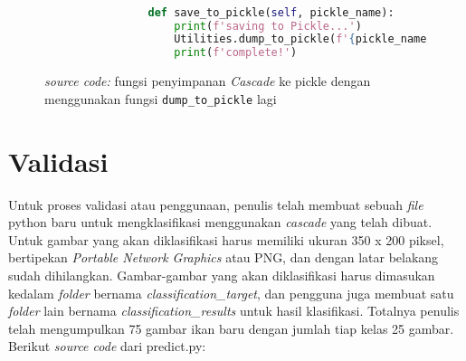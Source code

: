		\begin{figure}[H]
			\begin{lstlisting}[language=Python, basicstyle=\tiny]

				def save_to_pickle(self, pickle_name):
					print(f'saving to Pickle...')
					Utilities.dump_to_pickle(f'{pickle_name}', self)
					print(f'complete!')

			\end{lstlisting}
			\caption{\emph{source code: } fungsi penyimpanan \emph{Cascade} ke pickle 
			dengan menggunakan fungsi \texttt{dump\_to\_pickle} lagi}
			\label{code: save Cascade to pickle}
		\end{figure}

\section{Validasi}

		Untuk proses validasi atau penggunaan, penulis telah membuat sebuah \textit{file} 
		python baru untuk mengklasifikasi menggunakan \emph{cascade} yang telah dibuat. Untuk gambar 
		yang akan diklasifikasi harus memiliki ukuran 350 x 200 piksel, bertipekan \textit{Portable Network Graphics} 
		atau PNG, dan dengan latar belakang sudah dihilangkan. Gambar-gambar yang akan diklasifikasi harus 
		dimasukan kedalam \textit{folder} bernama \emph{classification\_target}, dan pengguna juga 
		membuat satu \textit{folder} lain bernama \emph{classification\_results} untuk hasil klasifikasi. 
		Totalnya penulis telah mengumpulkan 75 gambar ikan baru dengan jumlah tiap kelas 25 gambar.
		Berikut \textit{source code} dari predict.py:


